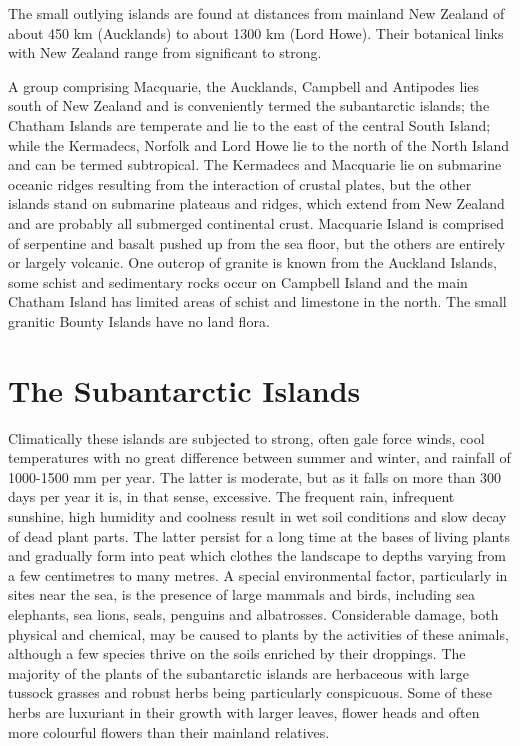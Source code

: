 The small outlying islands are found at distances from mainland New Zealand of about 450 km (Aucklands) to about 1300 km (Lord Howe).
Their botanical links with New Zealand range from significant to strong.

A group comprising Macquarie, the Aucklands, Campbell and Antipodes lies south of New Zealand and is conveniently termed the subantarctic islands; the Chatham Islands are temperate and lie to the east of the central South Island; while the Kermadecs, Norfolk and Lord Howe lie to the north of the North Island and can be termed subtropical.
The Kermadecs and Macquarie lie on submarine oceanic ridges resulting from the interaction of crustal plates, but the other islands stand on submarine plateaus and ridges, which extend from New Zealand and are probably all submerged continental crust.
Macquarie Island is comprised of serpentine and basalt pushed up from the sea floor, but the others are entirely or largely volcanic.
One outcrop of granite is known from the Auckland Islands, some schist and sedimentary rocks occur on Campbell Island and the main Chatham Island has limited areas of schist and limestone in the north.
The small granitic Bounty Islands have no land flora.

\section{The Subantarctic Islands}

Climatically these islands are subjected to strong, often gale force winds, cool temperatures with no great difference between summer and winter, and rainfall of 1000-1500 mm per year.
The latter is moderate, but as it falls on more than 300 days per year it is, in that sense, excessive.
The frequent rain, infrequent sunshine, high humidity and coolness result in wet soil conditions and slow decay of dead plant parts.
The latter persist for a long time at the bases of living plants and gradually form into peat which clothes the landscape to depths varying from a few centimetres to many metres.
A special environmental factor, particularly in sites near the sea, is the presence of large mammals and  birds, including sea elephants, sea lions, seals, penguins and albatrosses.
Considerable damage, both physical and chemical, may be caused to plants by the activities of these animals, although a few species thrive on the soils enriched by their droppings.
The majority of the plants of the subantarctic islands are herbaceous with large tussock grasses and robust herbs being particularly conspicuous.
Some of these herbs are luxuriant in their growth with larger leaves, flower heads and often more colourful flowers than their mainland relatives.

